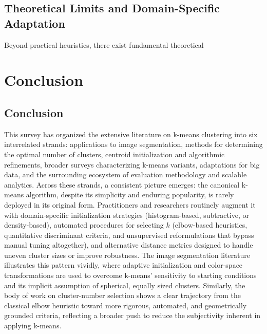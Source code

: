 \subsection{Theoretical Limits and Domain-Specific Adaptation}
Beyond practical heuristics, there exist fundamental theoretical

\section{Conclusion}\label{sec:conclusion}
\subsection{Conclusion}

This survey has organized the extensive literature on k-means clustering into six interrelated strands: applications to image segmentation, methods for determining the optimal number of clusters, centroid initialization and algorithmic refinements, broader surveys characterizing k-means variants, adaptations for big data, and the surrounding ecosystem of evaluation methodology and scalable analytics. Across these strands, a consistent picture emerges: the canonical k-means algorithm, despite its simplicity and enduring popularity, is rarely deployed in its original form. Practitioners and researchers routinely augment it with domain-specific initialization strategies (histogram-based, subtractive, or density-based), automated procedures for selecting $k$ (elbow-based heuristics, quantitative discriminant criteria, and unsupervised reformulations that bypass manual tuning altogether), and alternative distance metrics designed to handle uneven cluster sizes or improve robustness. The image segmentation literature illustrates this pattern vividly, where adaptive initialization and color-space transformations are used to overcome k-means' sensitivity to starting conditions and its implicit assumption of spherical, equally sized clusters. Similarly, the body of work on cluster-number selection shows a clear trajectory from the classical elbow heuristic toward more rigorous, automated, and geometrically grounded criteria, reflecting a broader push to reduce the subjectivity inherent in applying k-means.

